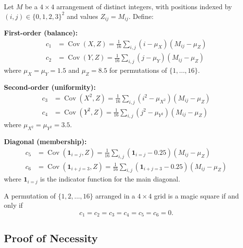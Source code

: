 \begin{definition}\label{def:six-cov}
Let $M$ be a $4 \times 4$ arrangement of distinct integers, with positions indexed by $(i,j) \in \{0,1,2,3\}^2$ and values $Z_{ij} = M_{ij}$. Define:

\textbf{First-order (balance):}
\begin{align}
c_1 &= \operatorname{Cov}(X, Z) = \frac{1}{16}\sum_{i,j} (i - \mu_X)(M_{ij} - \mu_Z)\\
c_2 &= \operatorname{Cov}(Y, Z) = \frac{1}{16}\sum_{i,j} (j - \mu_Y)(M_{ij} - \mu_Z)
\end{align}
where $\mu_X = \mu_Y = 1.5$ and $\mu_Z = 8.5$ for permutations of $\{1,\ldots,16\}$.

\textbf{Second-order (uniformity):}
\begin{align}
c_3 &= \operatorname{Cov}(X^2, Z) = \frac{1}{16}\sum_{i,j} (i^2 - \mu_{X^2})(M_{ij} - \mu_Z)\\
c_4 &= \operatorname{Cov}(Y^2, Z) = \frac{1}{16}\sum_{i,j} (j^2 - \mu_{Y^2})(M_{ij} - \mu_Z)
\end{align}
where $\mu_{X^2} = \mu_{Y^2} = 3.5$.

\textbf{Diagonal (membership):}
\begin{align}
c_5 &= \operatorname{Cov}(\mathbf{1}_{i=j}, Z) = \frac{1}{16}\sum_{i,j} (\mathbf{1}_{i=j} - 0.25)(M_{ij} - \mu_Z)\\
c_6 &= \operatorname{Cov}(\mathbf{1}_{i+j=3}, Z) = \frac{1}{16}\sum_{i,j} (\mathbf{1}_{i+j=3} - 0.25)(M_{ij} - \mu_Z)
\end{align}
where $\mathbf{1}_{i=j}$ is the indicator function for the main diagonal.
\end{definition}

\begin{theorem}\label{thm:main}
A permutation of $\{1, 2, \ldots, 16\}$ arranged in a $4 \times 4$ grid is a magic square if and only if
\[c_1 = c_2 = c_3 = c_4 = c_5 = c_6 = 0.\]
\end{theorem}

\subsection{Proof of Necessity}


